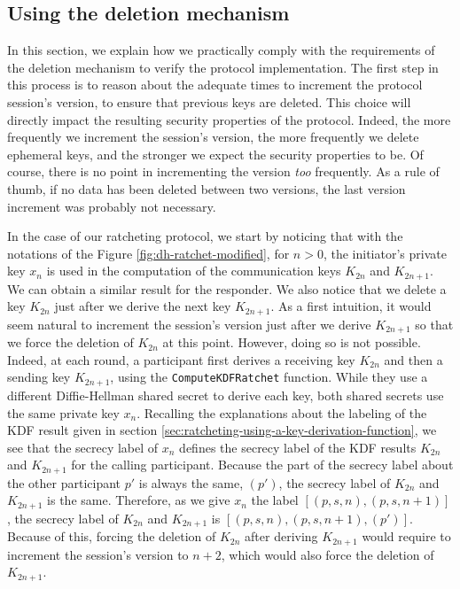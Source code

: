 \subsection{Using the deletion mechanism}

In this section, we explain how we practically comply with the requirements of the deletion mechanism to verify the protocol implementation.
The first step in this process is to reason about the adequate times to increment the protocol session's version, to ensure that previous keys are deleted.
This choice will directly impact the resulting security properties of the protocol.
Indeed, the more frequently we increment the session's version, the more frequently we delete ephemeral keys, and the stronger we expect the security properties to be.
Of course, there is no point in incrementing the version \emph{too} frequently. As a rule of thumb, if no data has been deleted between two versions, the last version increment was probably not necessary.

In the case of our ratcheting protocol, we start by noticing that with the notations of the Figure \ref{fig:dh-ratchet-modified}, for $n>0$, the initiator's private key $x_n$ is used in the computation of the communication keys $K_{2n}$ and $K_{2n+1}$. We can obtain a similar result for the responder.
We also notice that we delete a key $K_{2n}$ just after we derive the next key $K_{2n+1}$.
As a first intuition, it would seem natural to increment the session's version just after we derive $K_{2n+1}$ so that we force the deletion of $K_{2n}$ at this point.
However, doing so is not possible.
Indeed, at each round, a participant first derives a receiving key $K_{2n}$ and then a sending key $K_{2n+1}$, using the \texttt{ComputeKDFRatchet} function.
While they use a different Diffie-Hellman shared secret to derive each key, both shared secrets use the same private key $x_n$.
Recalling the explanations about the labeling of the KDF result given in section \ref{sec:ratcheting-using-a-key-derivation-function}, we see that the secrecy label of $x_{n}$ defines the secrecy label of the KDF results $K_{2n}$ and $K_{2n+1}$ for the calling participant.
Because the part of the secrecy label about the other participant $p'$ is always the same, $(p')$, the secrecy label of $K_{2n}$ and $K_{2n+1}$ is the same.
Therefore, as we give $x_{n}$ the label $[(p,s,n),(p,s,n+1)]$, the secrecy label of $K_{2n}$ and $K_{2n+1}$ is $[(p,s,n),(p,s,n+1),(p')]$.
Because of this, forcing the deletion of $K_{2n}$ after deriving $K_{2n+1}$ would require to increment the session's version to $n+2$, which would also force the deletion of $K_{2n+1}$.

